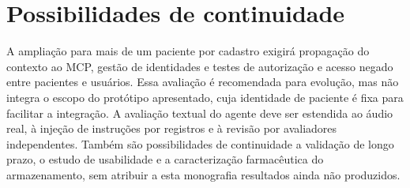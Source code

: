 \section{Possibilidades de continuidade}
A ampliação para mais de um paciente por cadastro exigirá propagação do contexto ao MCP, gestão de identidades e testes de autorização e acesso negado entre pacientes e usuários. Essa avaliação é recomendada para evolução, mas não integra o escopo do protótipo apresentado, cuja identidade de paciente é fixa para facilitar a integração. A avaliação textual do agente deve ser estendida ao áudio real, à injeção de instruções por registros e à revisão por avaliadores independentes. Também são possibilidades de continuidade a validação de longo prazo, o estudo de usabilidade e a caracterização farmacêutica do armazenamento, sem atribuir a esta monografia resultados ainda não produzidos.
